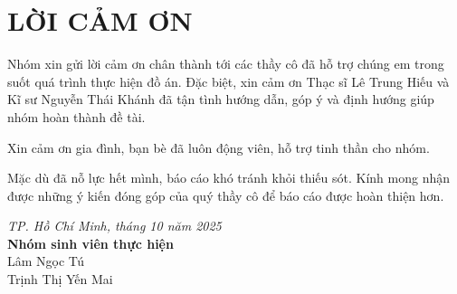 \chapter*{LỜI CẢM ƠN}

Nhóm xin gửi lời cảm ơn chân thành tới các thầy cô đã hỗ trợ chúng em trong suốt quá trình thực hiện đồ án. Đặc biệt, xin cảm ơn Thạc sĩ Lê Trung Hiếu và Kĩ sư Nguyễn Thái Khánh đã tận tình hướng dẫn, góp ý và định hướng giúp nhóm hoàn thành đề tài.

Xin cảm ơn gia đình, bạn bè đã luôn động viên, hỗ trợ tinh thần cho nhóm.

Mặc dù đã nỗ lực hết mình, báo cáo khó tránh khỏi thiếu sót. Kính mong nhận được những ý kiến đóng góp của quý thầy cô để báo cáo được hoàn thiện hơn.

\vspace{1cm}
\begin{flushright}
    \textit{TP. Hồ Chí Minh, tháng 10 năm 2025}\\
    \textbf{Nhóm sinh viên thực hiện}\\
    Lâm Ngọc Tú\\
    Trịnh Thị Yến Mai
\end{flushright}
\clearpage
